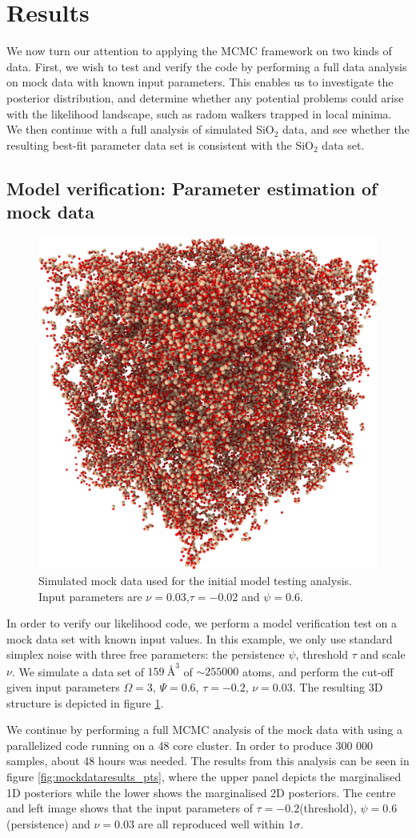 \documentclass[aps,pre,twocolumn,letterpaper,floatfix,showpacs]{revtex4}
\begin{document}
\section{Results}
We now turn our attention to applying the MCMC framework on two kinds of data. First, we wish to test and verify the code by performing a full data analysis on mock data with known input parameters. This enables us to investigate the posterior distribution, and determine whether any potential problems could arise with the likelihood landscape, such as radom walkers trapped in local minima. We then continue with a full analysis of simulated SiO$_2$ data, and see whether the resulting best-fit parameter data set is consistent with the SiO$_2$ data set. 

\subsection{Model verification: Parameter estimation of mock data}
\begin{figure}[htb!]
\includegraphics[width=.45\textwidth]{model_test.png}
\caption{Simulated mock data used for the initial model testing analysis. Input parameters are $\nu=0.03$,$\tau=-0.02$ and $\psi=0.6$.}
\label{fig:mockdata}
\end{figure}
In order to verify our likelihood code, we perform a model verification test on a mock data set with known input values. In this example, we only use standard simplex noise with three free parameters: the persistence $\psi$, threshold $\tau$ and scale $\nu$. We simulate a data set of $\SI{159} {\angstrom}^3$ of $\sim 255 000$ atoms, and perform the cut-off given input parameters $\Omega=3$, $\Psi = 0.6$, $\tau=-0.2$, $\nu=0.03$. The resulting 3D structure is depicted in figure \ref{fig:mockdata}. 

We continue by performing a full MCMC analysis of the mock data with using a parallelized code running on a 48 core cluster. In order to produce 300 000 samples, about 48 hours was needed. The results from this analysis can be seen in figure \ref{fig:mockdataresults_pts}, where the upper panel depicts the marginalised 1D posteriors while the lower shows the marginalised 2D posteriors. The centre and left image shows that the input parameters of $\tau=-0.2$(threshold), $\psi=0.6$(persistence) and $\nu=0.03$ are all reproduced well within $1 \sigma$.
\end{document}
